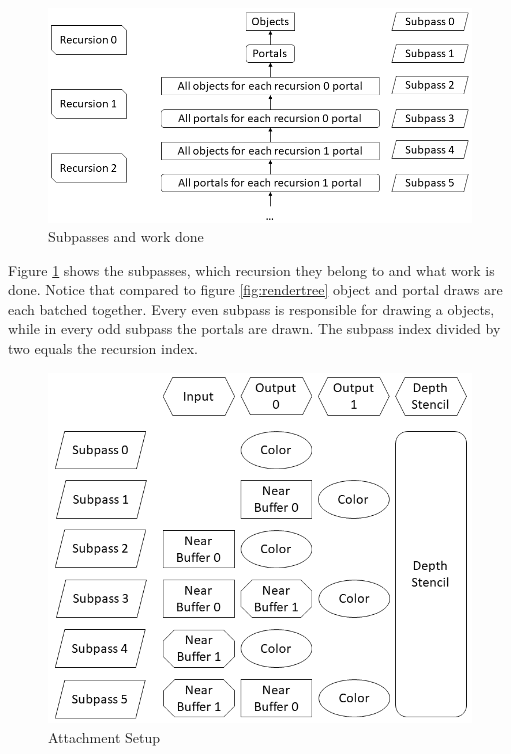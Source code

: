 \begin{figure}[h]
	\includegraphics[width=\linewidth]{images/renderpasses.png}
	\caption{Subpasses and work done}
	\label{fig:renderpasses}
\end{figure}


Figure \ref{fig:renderpasses} shows the subpasses, which recursion they belong to and what work is done. Notice that compared to figure \ref{fig:rendertree} object and portal draws are each batched together. Every even subpass is responsible for drawing a objects, while in every odd subpass the portals are drawn. The subpass index divided by two equals the recursion index. 

\begin{figure}[h]
	\includegraphics[width=\linewidth]{images/attachmentsetup.png}
	\caption{Attachment Setup}
	\label{fig:attachments}
\end{figure}


